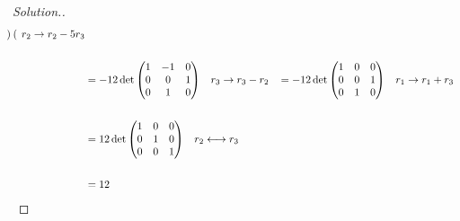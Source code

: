 \documentclass[11pt,a4paper]{article}
\theoremstyle{definition}
\newenvironment{solution}
  {\renewcommand{\qedsymbol}{}\begin{proof}[\textit{Solution}.]}
  {\end{proof}}
\begin{document}
\begin{solution}
\begin{align*}
\begin{pmatrix}
\end{pmatrix}
\hspace{0.3cm}
\begin{matrix}
r_2\rightarrow r_2-5r_3\\
\end{matrix}\\\\
&=-12\det
\begin{pmatrix}
1&-1&0\\0&0&1\\0&1&0\\
\end{pmatrix}
\hspace{0.3cm}
\begin{matrix}
r_3\rightarrow r_3-r_2\\
\end{matrix}
\hspace{0.3cm}
=-12\det
\begin{pmatrix}
1&0&0\\ 0&0&1\\0&1&0\\
\end{pmatrix}
\hspace{0.3cm}
\begin{matrix}
r_1\rightarrow r_1+r_3\\
\end{matrix}\\\\
&=12\det
\begin{pmatrix}
1&0&0\\0&1&0\\0&0&1\\
\end{pmatrix}
\hspace{0.3cm}
\begin{matrix}
r_2\longleftrightarrow r_3
\end{matrix}\\\\
&=12\\
\end{align*}


\end{solution}
\end{document}

